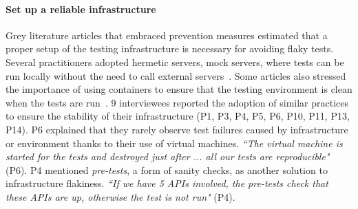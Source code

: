 \paragraph{\textbf{Set up a reliable infrastructure}}
Grey literature articles that embraced prevention measures estimated that a proper setup of the testing infrastructure is necessary for avoiding flaky tests.
Several practitioners adopted hermetic servers, \aka mock servers, where tests can be run locally without the need to call external servers~\cite{TestStab71:online,Flakytes0:online,Howtofix72:online}.
Some articles also stressed the importance of using containers to ensure that the testing environment is clean when the tests are run~\cite{Effectiv86:online}.
9 interviewees reported the adoption of similar practices to ensure the stability of their infrastructure (P1, P3, P4, P5, P6, P10, P11, P13, P14).
P6 explained that they rarely observe test failures caused by infrastructure or environment thanks to their use of virtual machines.
\textit{``The virtual machine is started for the tests and destroyed just after ... all our tests are reproducible"} (P6).
P4 mentioned \textit{pre-tests}, a form of sanity checks, as another solution to infrastructure flakiness.
\textit{``If we have 5 APIs involved, the pre-tests check that these APIs are up, otherwise the test is not run"} (P4).


